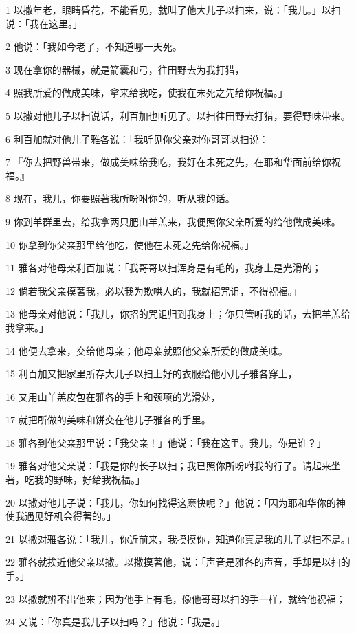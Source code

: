 \par 1 以撒年老，眼睛昏花，不能看见，就叫了他大儿子以扫来，说：「我儿。」以扫说：「我在这里。」
\par 2 他说：「我如今老了，不知道哪一天死。
\par 3 现在拿你的器械，就是箭囊和弓，往田野去为我打猎，
\par 4 照我所爱的做成美味，拿来给我吃，使我在未死之先给你祝福。」
\par 5 以撒对他儿子以扫说话，利百加也听见了。以扫往田野去打猎，要得野味带来。
\par 6 利百加就对他儿子雅各说：「我听见你父亲对你哥哥以扫说：
\par 7 『你去把野兽带来，做成美味给我吃，我好在未死之先，在耶和华面前给你祝福。』
\par 8 现在，我儿，你要照著我所吩咐你的，听从我的话。
\par 9 你到羊群里去，给我拿两只肥山羊羔来，我便照你父亲所爱的给他做成美味。
\par 10 你拿到你父亲那里给他吃，使他在未死之先给你祝福。」
\par 11 雅各对他母亲利百加说：「我哥哥以扫浑身是有毛的，我身上是光滑的；
\par 12 倘若我父亲摸著我，必以我为欺哄人的，我就招咒诅，不得祝福。」
\par 13 他母亲对他说：「我儿，你招的咒诅归到我身上；你只管听我的话，去把羊羔给我拿来。」
\par 14 他便去拿来，交给他母亲；他母亲就照他父亲所爱的做成美味。
\par 15 利百加又把家里所存大儿子以扫上好的衣服给他小儿子雅各穿上，
\par 16 又用山羊羔皮包在雅各的手上和颈项的光滑处，
\par 17 就把所做的美味和饼交在他儿子雅各的手里。
\par 18 雅各到他父亲那里说：「我父亲！」他说：「我在这里。我儿，你是谁？」
\par 19 雅各对他父亲说：「我是你的长子以扫；我已照你所吩咐我的行了。请起来坐著，吃我的野味，好给我祝福。」
\par 20 以撒对他儿子说：「我儿，你如何找得这麽快呢？」他说：「因为耶和华你的神使我遇见好机会得著的。」
\par 21 以撒对雅各说：「我儿，你近前来，我摸摸你，知道你真是我的儿子以扫不是。」
\par 22 雅各就挨近他父亲以撒。以撒摸著他，说：「声音是雅各的声音，手却是以扫的手。」
\par 23 以撒就辨不出他来；因为他手上有毛，像他哥哥以扫的手一样，就给他祝福；
\par 24 又说：「你真是我儿子以扫吗？」他说：「我是。」
